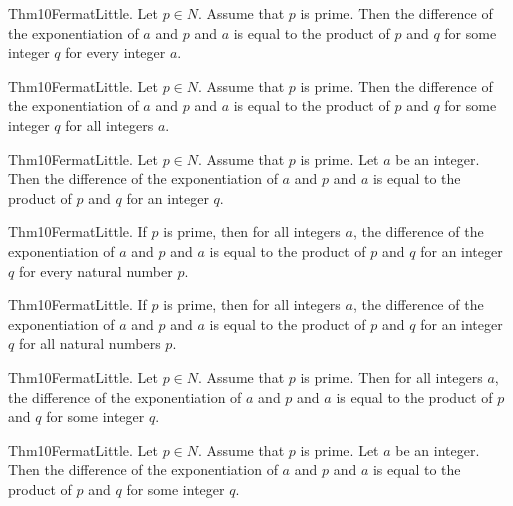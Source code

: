 \documentclass{article}
\begin{document}
Thm10FermatLittle. Let $p \in N$. Assume that $p$ is prime. Then the difference of the exponentiation of $a$ and $p$ and $a$ is equal to the product of $p$ and $q$ for some integer $q$ for every integer $a$.

Thm10FermatLittle. Let $p \in N$. Assume that $p$ is prime. Then the difference of the exponentiation of $a$ and $p$ and $a$ is equal to the product of $p$ and $q$ for some integer $q$ for all integers $a$.

Thm10FermatLittle. Let $p \in N$. Assume that $p$ is prime. Let $a$ be an integer. Then the difference of the exponentiation of $a$ and $p$ and $a$ is equal to the product of $p$ and $q$ for an integer $q$.

Thm10FermatLittle. If $p$ is prime, then for all integers $a$, the difference of the exponentiation of $a$ and $p$ and $a$ is equal to the product of $p$ and $q$ for an integer $q$ for every natural number $p$.

Thm10FermatLittle. If $p$ is prime, then for all integers $a$, the difference of the exponentiation of $a$ and $p$ and $a$ is equal to the product of $p$ and $q$ for an integer $q$ for all natural numbers $p$.

Thm10FermatLittle. Let $p \in N$. Assume that $p$ is prime. Then for all integers $a$, the difference of the exponentiation of $a$ and $p$ and $a$ is equal to the product of $p$ and $q$ for some integer $q$.

Thm10FermatLittle. Let $p \in N$. Assume that $p$ is prime. Let $a$ be an integer. Then the difference of the exponentiation of $a$ and $p$ and $a$ is equal to the product of $p$ and $q$ for some integer $q$.
\end{document}
